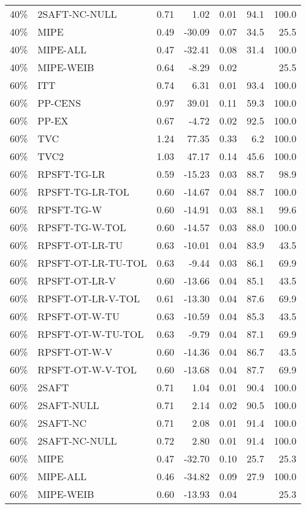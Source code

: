\begin{table}[ht]
{\begin{tabular}{llrrrrr}
  40\% & 2SAFT-NC-NULL & 0.71 & 1.02 & 0.01 & 94.1 & 100.0 \\ 
  40\% & MIPE & 0.49 & -30.09 & 0.07 & 34.5 & 25.5 \\ 
  40\% & MIPE-ALL & 0.47 & -32.41 & 0.08 & 31.4 & 100.0 \\ 
  40\% & MIPE-WEIB & 0.64 & -8.29 & 0.02 &  & 25.5 \\ 
   \hline
60\% & ITT & 0.74 & 6.31 & 0.01 & 93.4 & 100.0 \\ 
  60\% & PP-CENS & 0.97 & 39.01 & 0.11 & 59.3 & 100.0 \\ 
  60\% & PP-EX & 0.67 & -4.72 & 0.02 & 92.5 & 100.0 \\ 
  60\% & TVC & 1.24 & 77.35 & 0.33 & 6.2 & 100.0 \\ 
  60\% & TVC2 & 1.03 & 47.17 & 0.14 & 45.6 & 100.0 \\ 
   \hline
60\% & RPSFT-TG-LR & 0.59 & -15.23 & 0.03 & 88.7 & 98.9 \\ 
  60\% & RPSFT-TG-LR-TOL & 0.60 & -14.67 & 0.04 & 88.7 & 100.0 \\ 
  60\% & RPSFT-TG-W & 0.60 & -14.91 & 0.03 & 88.1 & 99.6 \\ 
  60\% & RPSFT-TG-W-TOL & 0.60 & -14.57 & 0.03 & 88.0 & 100.0 \\ 
  60\% & RPSFT-OT-LR-TU & 0.63 & -10.01 & 0.04 & 83.9 & 43.5 \\ 
  60\% & RPSFT-OT-LR-TU-TOL & 0.63 & -9.44 & 0.03 & 86.1 & 69.9 \\ 
  60\% & RPSFT-OT-LR-V & 0.60 & -13.66 & 0.04 & 85.1 & 43.5 \\ 
  60\% & RPSFT-OT-LR-V-TOL & 0.61 & -13.30 & 0.04 & 87.6 & 69.9 \\ 
   \hline
60\% & RPSFT-OT-W-TU & 0.63 & -10.59 & 0.04 & 85.3 & 43.5 \\ 
  60\% & RPSFT-OT-W-TU-TOL & 0.63 & -9.79 & 0.04 & 87.1 & 69.9 \\ 
  60\% & RPSFT-OT-W-V & 0.60 & -14.36 & 0.04 & 86.7 & 43.5 \\ 
  60\% & RPSFT-OT-W-V-TOL & 0.60 & -13.68 & 0.04 & 87.7 & 69.9 \\ 
   \hline
60\% & 2SAFT & 0.71 & 1.04 & 0.01 & 90.4 & 100.0 \\ 
  60\% & 2SAFT-NULL & 0.71 & 2.14 & 0.02 & 90.5 & 100.0 \\ 
  60\% & 2SAFT-NC & 0.71 & 2.08 & 0.01 & 91.4 & 100.0 \\ 
  60\% & 2SAFT-NC-NULL & 0.72 & 2.80 & 0.01 & 91.4 & 100.0 \\ 
  60\% & MIPE & 0.47 & -32.70 & 0.10 & 25.7 & 25.3 \\ 
  60\% & MIPE-ALL & 0.46 & -34.82 & 0.09 & 27.9 & 100.0 \\ 
  60\% & MIPE-WEIB & 0.60 & -13.93 & 0.04 &  & 25.3 \\ 
   \hline
\end{tabular}
}
\end{table}
